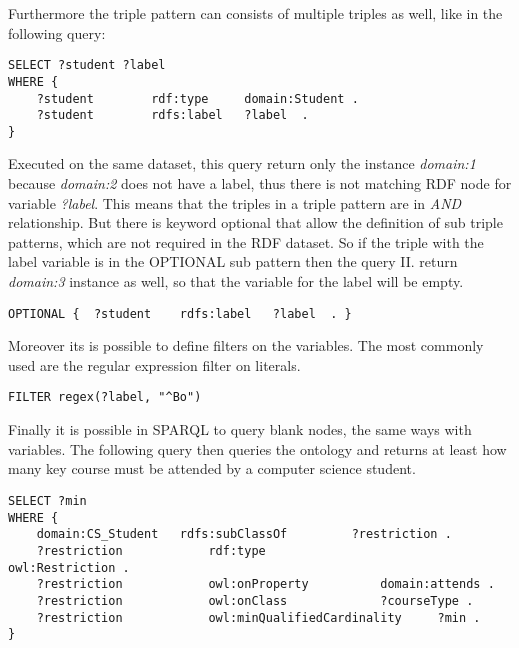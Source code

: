 Furthermore the triple pattern can consists of  multiple triples as well, like in the following query:

\begin{lstlisting}[captionpos=b, caption=SPARQL Query II., label=2nd:sparql, belowskip=1em, aboveskip=2em,
basicstyle=\footnotesize,frame=single]
SELECT ?student ?label 
WHERE { 
	?student		rdf:type	 domain:Student .	
	?student		rdfs:label	 ?label  .
}
\end{lstlisting}

Executed on the same dataset, this query return only the instance \textit{domain:1} because \textit{domain:2} does not have a label, thus there is not matching RDF node for variable \textit{?label}. This means that the triples in a triple pattern are in \textit{AND} relationship. But there is keyword optional that allow the definition of sub triple patterns, which are not required in the RDF dataset. So if the triple with the label variable is in the OPTIONAL sub pattern then the query II. return \textit{domain:3} instance as well, so that the variable for the label will be empty.

\begin{lstlisting}[captionpos=b, caption=Optional sub triple pattern., label=2nd:sparql, belowskip=1em, aboveskip=2em,
basicstyle=\footnotesize,frame=single]
OPTIONAL { 	?student	rdfs:label	 ?label  . } 
\end{lstlisting}

Moreover its is possible to define filters on the variables. The most commonly used are the regular expression filter on literals. 

\begin{lstlisting}[captionpos=b, caption=Regex filter in SPARQL, label=2nd:sparql, belowskip=1em, aboveskip=2em,
basicstyle=\footnotesize,frame=single]
FILTER regex(?label, "^Bo")
\end{lstlisting}

Finally it is possible in SPARQL to query blank nodes, the same ways with variables. The following query then queries the ontology and returns at least how many key course must be attended by a computer science student.

\begin{lstlisting}[captionpos=b, caption=SPARQL Query III., label=3rd:sparql, belowskip=1em, aboveskip=2em,
basicstyle=\footnotesize,frame=single]
SELECT ?min
WHERE {
	domain:CS_Student	rdfs:subClassOf			?restriction .
	?restriction			rdf:type						owl:Restriction .
	?restriction			owl:onProperty			domain:attends .
	?restriction			owl:onClass				?courseType .
	?restriction			owl:minQualifiedCardinality		?min .
}
\end{lstlisting}


